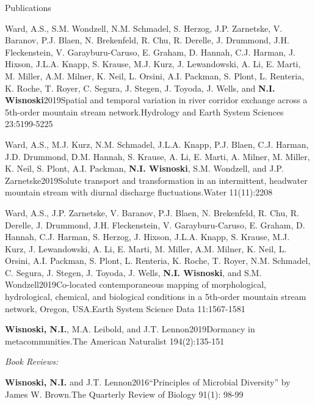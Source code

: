 \documentclass{resume} %
\begin{document}
\begin{rhangSection}{Publications}
\begin{Publication}{Ward, A.S., S.M. Wondzell, N.M. Schmadel, S. Herzog, J.P. Zarnetske, V. Baranov, P.J. Blaen, N. Brekenfeld, R. Chu, R. Derelle, J. Drummond, J.H. Fleckenstein, V. Garayburu-Caruso, E. Graham, D. Hannah, C.J. Harman, J. Hixson, J.L.A. Knapp, S. Krause, M.J. Kurz, J. Lewandowski, A. Li, E. Marti, M. Miller, A.M. Milner, K. Neil, L. Orsini, A.I. Packman, S. Plont, L. Renteria, K. Roche, T. Royer, C. Segura, J. Stegen, J. Toyoda, J. Wells, and {\bf N.I. Wisnoski}}{2019}{Spatial and temporal variation in river corridor exchange across a 5th-order mountain stream network.}{Hydrology and Earth System Sciences 23:5199-5225} 
\end{Publication}

\begin{Publication}{Ward, A.S., M.J. Kurz, N.M. Schmadel, J.L.A. Knapp, P.J. Blaen, C.J. Harman, J.D. Drummond, D.M. Hannah, S. Krause, A. Li, E. Marti, A. Milner, M. Miller, K. Neil, S. Plont, A.I. Packman, {\bf N.I. Wisnoski}, S.M. Wondzell, and J.P. Zarnetske}{2019}{Solute transport and transformation in an intermittent, headwater mountain stream with diurnal discharge fluctuations.}{Water 11(11):2208}
\end{Publication}

\begin{Publication}{Ward, A.S., J.P. Zarnetske, V. Baranov, P.J. Blaen, N. Brekenfeld, R. Chu, R. Derelle, J. Drummond, J.H. Fleckenstein, V. Garayburu-Caruso, E. Graham, D. Hannah, C.J. Harman, S. Herzog, J. Hixson, J.L.A. Knapp, S. Krause, M.J. Kurz, J. Lewandowski, A. Li, E. Marti, M. Miller, A.M. Milner, K. Neil, L. Orsini, A.I. Packman, S. Plont, L. Renteria, K. Roche, T. Royer, N.M. Schmadel, C. Segura, J. Stegen, J. Toyoda, J. Wells, {\bf N.I. Wisnoski}, and S.M. Wondzell}{2019}{Co-located contemporaneous mapping of morphological, hydrological, chemical, and biological conditions in a 5th-order mountain stream network, Oregon, USA.}{Earth System Science Data 11:1567-1581}
\end{Publication}

\begin{Publication}{{\bf Wisnoski, N.I.}, M.A. Leibold, and J.T. Lennon}{2019}{Dormancy in metacommunities.}{The American Naturalist 194(2):135-151}
\end{Publication}

\bigskip

{\it Book Reviews:}
\begin{Publication}{{\bf Wisnoski, N.I.} and J.T. Lennon}{2016}{\enquote{Principles of Microbial Diversity} by James W. Brown.}{The Quarterly Review of Biology 91(1): 98-99}
\end{Publication}

\end{rhangSection}
\end{document}
